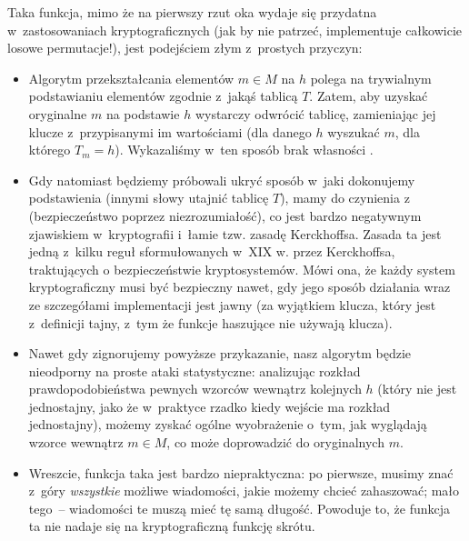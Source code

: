Taka funkcja, mimo że na pierwszy rzut oka wydaje się przydatna
w~zastosowaniach kryptograficznych (jak by nie patrzeć, implementuje całkowicie
losowe permutacje!), jest podejściem złym z~prostych przyczyn:

\begin{itemize}

    \item Algorytm przekształcania elementów $m \in M$ na $h$ polega na
    trywialnym podstawianiu elementów zgodnie z~jakąś tablicą $T$. Zatem, aby
    uzyskać oryginalne $m$ na podstawie $h$ wystarczy odwrócić tablicę,
    zamieniając jej klucze z~przypisanymi im wartościami (dla danego $h$
    wyszukać $m$, dla którego $T_m = h$). Wykazaliśmy w~ten sposób brak
    własności .

    \item Gdy natomiast będziemy próbowali ukryć sposób w~jaki dokonujemy
    podstawienia (innymi słowy utajnić tablicę $T$), mamy do czynienia
    z~ (bezpieczeństwo poprzez niezrozumiałość),
    co jest bardzo negatywnym zjawiskiem w~kryptografii i~łamie tzw. zasadę
    Kerckhoffsa. Zasada ta jest jedną z~kilku reguł sformułowanych w~XIX w.
    przez Kerckhoffsa, traktujących o bezpieczeństwie kryptosystemów. Mówi ona,
    że każdy system kryptograficzny musi być bezpieczny nawet, gdy jego sposób
    działania wraz ze szczegółami implementacji jest jawny (za wyjątkiem
    klucza, który jest z~definicji tajny, z~tym że funkcje haszujące nie
    używają klucza).

    \item Nawet gdy zignorujemy powyższe przykazanie, nasz algorytm będzie
    nieodporny na proste ataki statystyczne: analizując rozkład
    prawdopodobieństwa pewnych wzorców wewnątrz kolejnych $h$ (który nie jest
    jednostajny, jako że w~praktyce rzadko kiedy wejście ma rozkład
    jednostajny), możemy zyskać ogólne wyobrażenie o~tym, jak wyglądają wzorce
    wewnątrz $m \in M$, co może doprowadzić do oryginalnych $m$.

    \item Wreszcie, funkcja taka jest bardzo niepraktyczna: po pierwsze, musimy
    znać z~góry \emph{wszystkie} możliwe wiadomości, jakie możemy chcieć
    zahaszować; mało tego~-- wiadomości te muszą mieć tę samą długość. Powoduje
    to, że funkcja ta nie nadaje się na kryptograficzną funkcję skrótu.

\end{itemize}



